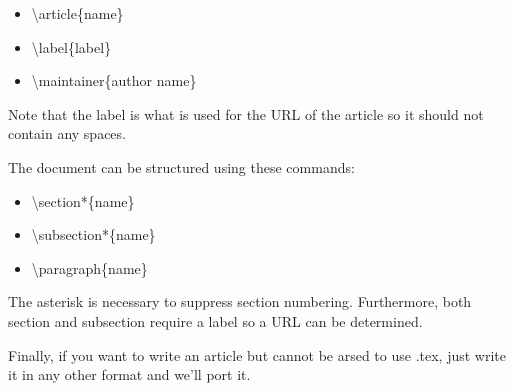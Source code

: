 \begin{itemize}
	\item {\textbackslash}article\{name\}
	\item {\textbackslash}label\{label\}
	\item {\textbackslash}maintainer\{author name\}
\end{itemize}

Note that the label is what is used for the URL of the article so it should not contain any spaces.

The document can be structured using these commands:

\begin{itemize}
	\item {\textbackslash}section*\{name\}
	\item {\textbackslash}subsection*\{name\}
	\item {\textbackslash}paragraph\{name\}
\end{itemize}

The asterisk is necessary to suppress section numbering. Furthermore, both section and subsection require a label so a URL can be determined.

Finally, if you want to write an article but cannot be arsed to use .tex, just write it in any other format and we'll port it.